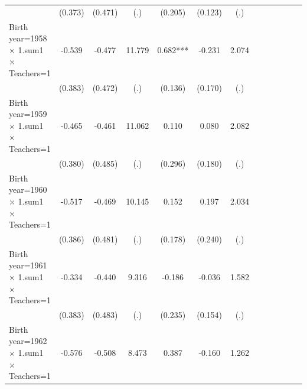 {\begin{tabular}{l*{12}{c}}
                    &     (0.373)   &     (0.471)   &         (.)   &     (0.205)   &     (0.123)   &         (.)   &               &               &               &               &               &               \\
Birth year=1958 $\times$ 1.sum1 $\times$ Teachers=1&      -0.539   &      -0.477   &      11.779   &       0.682***&      -0.231   &       2.074   &               &               &               &               &               &               \\
                    &     (0.383)   &     (0.472)   &         (.)   &     (0.136)   &     (0.170)   &         (.)   &               &               &               &               &               &               \\
Birth year=1959 $\times$ 1.sum1 $\times$ Teachers=1&      -0.465   &      -0.461   &      11.062   &       0.110   &       0.080   &       2.082   &               &               &               &               &               &               \\
                    &     (0.380)   &     (0.485)   &         (.)   &     (0.296)   &     (0.180)   &         (.)   &               &               &               &               &               &               \\
Birth year=1960 $\times$ 1.sum1 $\times$ Teachers=1&      -0.517   &      -0.469   &      10.145   &       0.152   &       0.197   &       2.034   &               &               &               &               &               &               \\
                    &     (0.386)   &     (0.481)   &         (.)   &     (0.178)   &     (0.240)   &         (.)   &               &               &               &               &               &               \\
Birth year=1961 $\times$ 1.sum1 $\times$ Teachers=1&      -0.334   &      -0.440   &       9.316   &      -0.186   &      -0.036   &       1.582   &               &               &               &               &               &               \\
                    &     (0.383)   &     (0.483)   &         (.)   &     (0.235)   &     (0.154)   &         (.)   &               &               &               &               &               &               \\
Birth year=1962 $\times$ 1.sum1 $\times$ Teachers=1&      -0.576   &      -0.508   &       8.473   &       0.387   &      -0.160   &       1.262   &               &               &               &               &               &               \\

\end{tabular}}
